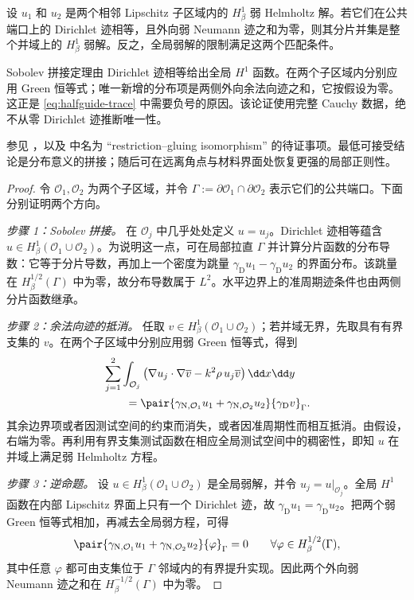 \begin{lemma}[人工端口处的弱拼接]
\label{lem:weak-gluing}
设 $u_1$ 和 $u_2$ 是两个相邻 Lipschitz 子区域内的 $H^1_\beta$ 弱 Helmholtz 解。若它们在公共端口上的 Dirichlet 迹相等，且外向弱 Neumann 迹之和为零，则其分片并集是整个并域上的 $H^1_\beta$ 弱解。反之，全局弱解的限制满足这两个匹配条件。
\end{lemma}
\begin{proofroadmap}
Sobolev 拼接定理由 Dirichlet 迹相等给出全局 $H^1$ 函数。在两个子区域内分别应用 Green 恒等式；唯一新增的分布项是两侧外向余法向迹之和，它按假设为零。这正是 \eqref{eq:halfguide-trace} 中需要负号的原因。该论证使用完整 Cauchy 数据，绝不从零 Dirichlet 迹推断唯一性。

参见 ，以及  中名为 ``restriction--gluing isomorphism'' 的待证事项。最低可接受结论是分布意义的拼接；随后可在远离角点与材料界面处恢复更强的局部正则性。
\end{proofroadmap}
\begin{proof}
令 $\mathcal O_1,\mathcal O_2$ 为两个子区域，并令
$\Gamma:=\partial\mathcal O_1\cap\partial\mathcal O_2$ 表示它们的公共端口。下面分别证明两个方向。

\emph{步骤 1：Sobolev 拼接。}
在 $\mathcal O_j$ 中几乎处处定义 $u=u_j$。Dirichlet 迹相等蕴含
$u\in H^1_\beta(\mathcal O_1\cup\mathcal O_2)$。为说明这一点，可在局部拉直 $\Gamma$ 并计算分片函数的分布导数：它等于分片导数，再加上一个密度为跳量
$\gamma_{\mathrm D}u_1-\gamma_{\mathrm D}u_2$ 的界面分布。该跳量在
$H^{1/2}_\beta(\Gamma)$ 中为零，故分布导数属于 $L^2$。水平边界上的准周期迹条件也由两侧分片函数继承。

\emph{步骤 2：余法向迹的抵消。}
任取 $v\in H^1_\beta(\mathcal O_1\cup\mathcal O_2)$；若并域无界，先取具有有界支集的 $v$。在两个子区域中分别应用弱 Green 恒等式，得到
\begin{align*}
  &\sum_{j=1}^2\int_{\mathcal O_j}
  \left(\nabla u_j\cdot\nabla\overline v
  -k^2\rho\,u_j\overline v\right)\dd x\dd y\\
  &\qquad=
  \pair{\gamma_{\mathrm N,\mathcal O_1}u_1+\gamma_{\mathrm N,\mathcal O_2}u_2}
  {\gamma_{\mathrm D}v}_{\Gamma}.
\end{align*}
其余边界项或者因测试空间的约束而消失，或者因准周期性而相互抵消。由假设，右端为零。再利用有界支集测试函数在相应全局测试空间中的稠密性，即知 $u$ 在并域上满足弱 Helmholtz 方程。

\emph{步骤 3：逆命题。}
设 $u\in H^1_\beta(\mathcal O_1\cup\mathcal O_2)$ 是全局弱解，并令
$u_j=u|_{\mathcal O_j}$。全局 $H^1$ 函数在内部 Lipschitz 界面上只有一个 Dirichlet 迹，故
$\gamma_{\mathrm D}u_1=\gamma_{\mathrm D}u_2$。把两个弱 Green 恒等式相加，再减去全局弱方程，可得
\[
  \pair{\gamma_{\mathrm N,\mathcal O_1}u_1+\gamma_{\mathrm N,\mathcal O_2}u_2}{\varphi}_{\Gamma}=0
  \qquad\forall\varphi\in H^{1/2}_\beta(\Gamma),
\]
其中任意 $\varphi$ 都可由支集位于 $\Gamma$ 邻域内的有界提升实现。因此两个外向弱 Neumann 迹之和在
$H^{-1/2}_\beta(\Gamma)$ 中为零。
\end{proof}

